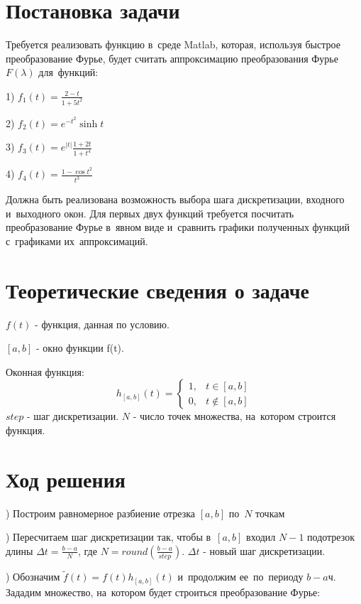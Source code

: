 \documentclass{article}
\begin{document}
\newpage
{\Large\bfseries\section{Постановка задачи}}
Требуется реализовать функцию в~среде Matlab, которая, используя быстрое преобразование Фурье, будет считать аппроксимацию преобразования Фурье
$F(\lambda)$ для~функций:

1) $f_1(t) = \frac{2-t}{1+5t^2}$

2) $f_2(t) = e^{-t^2} \sinh t$

3) $f_3(t) = e^{|t|}\frac{1+2t}{1+t^4}$

4) $f_4(t) = \frac{1-\cos t^2}{t^3}$

\noindent Должна быть реализована возможность выбора шага дискретизации, входного и~выходного окон.
Для первых двух функций требуется посчитать преобразование Фурье в~явном виде и~сравнить графики полученных функций с~графиками их~аппроксимаций.
\vspace{0.5cm}

{\Large\bfseries\section{Теоретические сведения о задаче}}
\noindent$f(t)$ - функция, данная по условию.

\noindent $[a,b]$ - окно функции f(t).

\noindent Оконная функция:
\[
h_{[a,b]}(t) =\begin{cases}
  1, & t \in [a,b] \\
  0, & t \notin [a,b]
\end{cases}
\]
\noident $step$ - шаг дискретизации.
\noident $N$ - число точек множества, на~котором строится функция.
\vspace{0.5cm}

{\Large\bfseries\section{Ход решения}}
) Построим равномерное разбиение отрезка $[a,b]$ по~$N$ точкам

) Пересчитаем шаг дискретизации так, чтобы в~$[a,b]$ входил $N-1$ подотрезок длины 
$\Delta t = \frac{b-a}{N}$, где $N = round(\frac{b-a}{step})$. $\Delta t$ - новый шаг дискретизации.

) Обозначим $\tilde f(t) = f(t)h_{[a,b]}(t)$ и~продолжим ее~по~периоду $b-aч$. Зададим множество, на~котором будет строиться преобразование Фурье:
\end{document}
